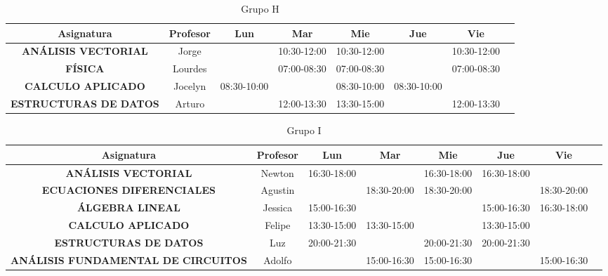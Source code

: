 \documentclass[10pt,letterpaper,twoside,openright]{article}
\begin{document}
	\begin{table}[h!]
		\centering
		\begin{adjustbox}{max width=\textwidth}
		\begin{tabular}{c||ccccccc}
		\textbf{Asignatura}                        & \textbf{Profesor} & \textbf{Lun} & \textbf{Mar} & \textbf{Mie} & \textbf{Jue} & \textbf{Vie} \\ \hline \hline
		\textbf{ANÁLISIS VECTORIAL}   & Jorge    &             & 10:30-12:00 & 10:30-12:00 &             & 10:30-12:00 \\
		\textbf{FÍSICA}               & Lourdes  &             & 07:00-08:30 & 07:00-08:30 &             & 07:00-08:30 \\
		\textbf{CALCULO APLICADO}     & Jocelyn  & 08:30-10:00 &             & 08:30-10:00 & 08:30-10:00 &             \\
		\textbf{ESTRUCTURAS DE DATOS} & Arturo   &             & 12:00-13:30 & 13:30-15:00 &             & 12:00-13:30
		\end{tabular}
		\end{adjustbox}
		\caption{Grupo H}
		\label{tab:grupo_h}
	\end{table}

	\begin{table}[h!]
		\centering
		\begin{adjustbox}{max width=\textwidth}
		\begin{tabular}{c||ccccccc}
		\textbf{Asignatura}                        & \textbf{Profesor} & \textbf{Lun} & \textbf{Mar} & \textbf{Mie} & \textbf{Jue} & \textbf{Vie} \\ \hline \hline
		\textbf{ANÁLISIS VECTORIAL}                & Newton   & 16:30-18:00 &             & 16:30-18:00 & 16:30-18:00 &             \\
		\textbf{ECUACIONES DIFERENCIALES}          & Agustin  &             & 18:30-20:00 & 18:30-20:00 &             & 18:30-20:00 \\
		\textbf{ÁLGEBRA LINEAL}                    & Jessica  & 15:00-16:30 &             &             & 15:00-16:30 & 16:30-18:00 \\
		\textbf{CALCULO APLICADO}                  & Felipe   & 13:30-15:00 & 13:30-15:00 &             & 13:30-15:00 &             \\
		\textbf{ESTRUCTURAS DE DATOS}              & Luz      & 20:00-21:30 &             & 20:00-21:30 & 20:00-21:30 &             \\
		\textbf{ANÁLISIS FUNDAMENTAL DE CIRCUITOS} & Adolfo   &             & 15:00-16:30 & 15:00-16:30 &             & 15:00-16:30
		\end{tabular}
		\end{adjustbox}
		\caption{Grupo I}
		\label{tab:grupo_i}
	\end{table}
\end{document}
